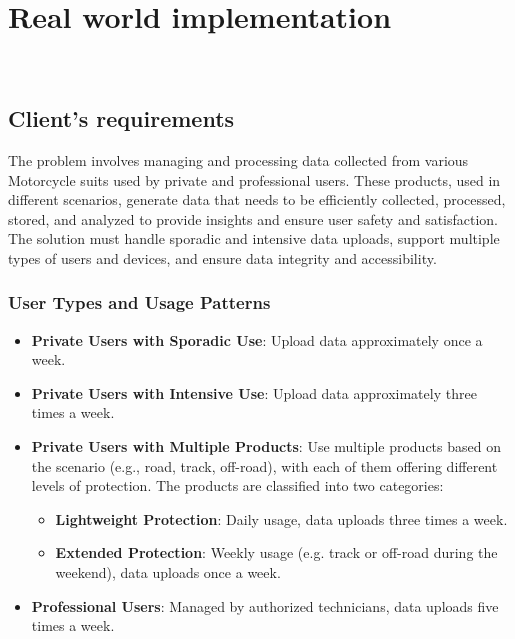 \chapter{Real world implementation}
\label{cap:real_implementation}

\\

\section{Client's requirements}
\label{sec:client_requirements}
The problem involves managing and processing data collected from various Motorcycle suits used by private and professional users. These products, used in different scenarios, generate data that needs to be efficiently collected, processed, stored, and analyzed to provide insights and ensure user safety and satisfaction. The solution must handle sporadic and intensive data uploads, support multiple types of users and devices, and ensure data integrity and accessibility.

\subsection*{User Types and Usage Patterns}
\begin{itemize}
    \item \textbf{Private Users with Sporadic Use}: Upload data approximately once a week.
    \item \textbf{Private Users with Intensive Use}: Upload data approximately three times a week.
    \item \textbf{Private Users with Multiple Products}: Use multiple products based on the scenario (e.g., road, track, off-road), with each of them offering different levels of protection. The products are classified into two categories:
    \begin{itemize}
        \item \textbf{Lightweight Protection}: Daily usage, data uploads three times a week.
        \item \textbf{Extended Protection}: Weekly usage (e.g. track or off-road during the weekend), data uploads once a week.
    \end{itemize}
    \item \textbf{Professional Users}: Managed by authorized technicians, data uploads five times a week.
\end{itemize}

